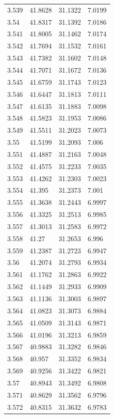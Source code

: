 \begin{tabular}{llll}
3.539 & 41.8628 & 31.1322 & 7.0199 \\
3.54 & 41.8317 & 31.1392 & 7.0186 \\
3.541 & 41.8005 & 31.1462 & 7.0174 \\
3.542 & 41.7694 & 31.1532 & 7.0161 \\
3.543 & 41.7382 & 31.1602 & 7.0148 \\
3.544 & 41.7071 & 31.1672 & 7.0136 \\
3.545 & 41.6759 & 31.1743 & 7.0123 \\
3.546 & 41.6447 & 31.1813 & 7.0111 \\
3.547 & 41.6135 & 31.1883 & 7.0098 \\
3.548 & 41.5823 & 31.1953 & 7.0086 \\
3.549 & 41.5511 & 31.2023 & 7.0073 \\
3.55 & 41.5199 & 31.2093 & 7.006 \\
3.551 & 41.4887 & 31.2163 & 7.0048 \\
3.552 & 41.4575 & 31.2233 & 7.0035 \\
3.553 & 41.4262 & 31.2303 & 7.0023 \\
3.554 & 41.395 & 31.2373 & 7.001 \\
3.555 & 41.3638 & 31.2443 & 6.9997 \\
3.556 & 41.3325 & 31.2513 & 6.9985 \\
3.557 & 41.3013 & 31.2583 & 6.9972 \\
3.558 & 41.27 & 31.2653 & 6.996 \\
3.559 & 41.2387 & 31.2723 & 6.9947 \\
3.56 & 41.2074 & 31.2793 & 6.9934 \\
3.561 & 41.1762 & 31.2863 & 6.9922 \\
3.562 & 41.1449 & 31.2933 & 6.9909 \\
3.563 & 41.1136 & 31.3003 & 6.9897 \\
3.564 & 41.0823 & 31.3073 & 6.9884 \\
3.565 & 41.0509 & 31.3143 & 6.9871 \\
3.566 & 41.0196 & 31.3213 & 6.9859 \\
3.567 & 40.9883 & 31.3282 & 6.9846 \\
3.568 & 40.957 & 31.3352 & 6.9834 \\
3.569 & 40.9256 & 31.3422 & 6.9821 \\
3.57 & 40.8943 & 31.3492 & 6.9808 \\
3.571 & 40.8629 & 31.3562 & 6.9796 \\
3.572 & 40.8315 & 31.3632 & 6.9783 \\

\end{tabular}
